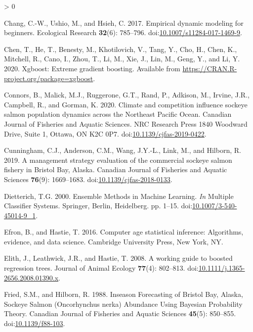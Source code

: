 \documentclass[
]{article}
\newlength{\cslhangindent}
\newenvironment{CSLReferences}[2] %
 {%
  \setlength{\parindent}{0pt}
  \ifodd #1 \everypar{\setlength{\hangindent}{\cslhangindent}}\ignorespaces\fi
  \ifnum #2 > 0
  \setlength{\parskip}{#2\baselineskip}
  \fi
 }%
 {}
\begin{document}
\begin{CSLReferences}{1}{0}
\leavevmode\hypertarget{ref-chang2017}{}%
Chang, C.-W., Ushio, M., and Hsieh, C. 2017. Empirical dynamic modeling for beginners. Ecological Research \textbf{32}(6): 785--796. doi:\href{https://doi.org/10.1007/s11284-017-1469-9}{10.1007/s11284-017-1469-9}.

\leavevmode\hypertarget{ref-chen2020}{}%
Chen, T., He, T., Benesty, M., Khotilovich, V., Tang, Y., Cho, H., Chen, K., Mitchell, R., Cano, I., Zhou, T., Li, M., Xie, J., Lin, M., Geng, Y., and Li, Y. 2020. Xgboost: Extreme gradient boosting. Available from \url{https://CRAN.R-project.org/package=xgboost}.

\leavevmode\hypertarget{ref-connors2020}{}%
Connors, B., Malick, M.J., Ruggerone, G.T., Rand, P., Adkison, M., Irvine, J.R., Campbell, R., and Gorman, K. 2020. Climate and competition influence sockeye salmon population dynamics across the {Northeast Pacific Ocean}. Canadian Journal of Fisheries and Aquatic Sciences. {NRC Research Press 1840 Woodward Drive, Suite 1, Ottawa, ON K2C 0P7}. doi:\href{https://doi.org/10.1139/cjfas-2019-0422}{10.1139/cjfas-2019-0422}.

\leavevmode\hypertarget{ref-cunningham2019}{}%
Cunningham, C.J., Anderson, C.M., Wang, J.Y.-L., Link, M., and Hilborn, R. 2019. A management strategy evaluation of the commercial sockeye salmon fishery in {Bristol Bay}, {Alaska}. Canadian Journal of Fisheries and Aquatic Sciences \textbf{76}(9): 1669--1683. doi:\href{https://doi.org/10.1139/cjfas-2018-0133}{10.1139/cjfas-2018-0133}.

\leavevmode\hypertarget{ref-Dietterich2000}{}%
Dietterich, T.G. 2000. Ensemble {Methods} in {Machine Learning}. \emph{In} Multiple {Classifier Systems}. {Springer, Berlin, Heidelberg}. pp. 1--15. doi:\href{https://doi.org/10.1007/3-540-45014-9_1}{10.1007/3-540-45014-9\_1}.

\leavevmode\hypertarget{ref-efron2016}{}%
Efron, B., and Hastie, T. 2016. Computer age statistical inference: Algorithms, evidence, and data science. {Cambridge University Press}, {New York, NY}.

\leavevmode\hypertarget{ref-elith2008}{}%
Elith, J., Leathwick, J.R., and Hastie, T. 2008. A working guide to boosted regression trees. Journal of Animal Ecology \textbf{77}(4): 802--813. doi:\href{https://doi.org/10.1111/j.1365-2656.2008.01390.x}{10.1111/j.1365-2656.2008.01390.x}.

\leavevmode\hypertarget{ref-fried1988}{}%
Fried, S.M., and Hilborn, R. 1988. Inseason {Forecasting} of {Bristol Bay}, {Alaska}, {Sockeye Salmon} ({Oncorhynchus} nerka) {Abundance Using Bayesian Probability Theory}. Canadian Journal of Fisheries and Aquatic Sciences \textbf{45}(5): 850--855. doi:\href{https://doi.org/10.1139/f88-103}{10.1139/f88-103}.


\end{CSLReferences}
\end{document}
